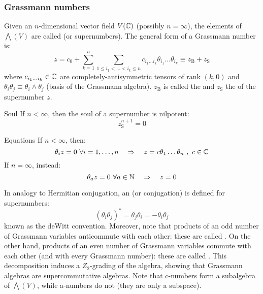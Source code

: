 \subsubsection{Grassmann numbers}
\label{sssec:grass-num}

Given an $ n $-dimensional vector field $ V(\mathbb{C}) $ (possibly $ n = \infty $), the elements of $ \bigwedge(V) $ are called  (or supernumbers). The general form of a Grassmann number is:
\begin{equation}
  z = c_0 + \sum_{k = 1}^n \sum_{1 \le i_1 < \dots < i_k \le n} c_{i_1 \dots i_k} \theta_{i_1} \dots \theta_{i_k} \equiv z_\text{B} + z_\text{S}
\end{equation}
where $ c_{i_1 \dots i_k} \in \mathbb{C} $ are completely-antisymmetric tensors of rank $ (k,0) $ and $ \theta_i \theta_j \equiv \theta_i \wedge \theta_j $ (basis of the Grassmann algebra). $ z_\text{B} $ is called the  and $ z_\text{S} $ the  of the supernumber $ z $.

\begin{proposition}{Soul}{}
  If $ n < \infty $, then the soul of a supernumber is nilpotent:
  \begin{equation}
    z_\text{S}^{n+1} = 0
  \end{equation}
\end{proposition}

\begin{lemma}{Equations}{}
  If $ n < \infty $, then:
  \begin{equation}
    \theta_i z = 0 \,\,\forall i = 1,\dots,n
    \quad \Rightarrow \quad
    z = c \theta_1 \dots \theta_n \,\, , \,\, c \in \mathbb{C}
  \end{equation}
  If $ n = \infty $, instead:
  \begin{equation}
    \theta_a z = 0 \,\,\forall a \in \mathbb{N}
    \quad \Rightarrow \quad
    z = 0
  \end{equation}
\end{lemma}

In analogy to Hermitian conjugation, an  (or conjugation) is defined for supernumbers:
\begin{equation}
  (\theta_i \theta_j)^* = \theta_j \theta_i = - \theta_i \theta_j
\end{equation}
known as the deWitt convention. Moreover, note that products of an odd number of Grassmann variables anticommute with each other: these are called . On the other hand, products of an even number of Grassmann variables commute with each other (and with every Grassmann number): these are called . This decomposition induces a $ Z_2 $-grading of the algebra, showing that Grassmann algebras are supercommutative algebras\footnotemark. Note that c-numbers form a subalgebra of $ \bigwedge(V) $, while a-numbers do not (they are only a subspace).

